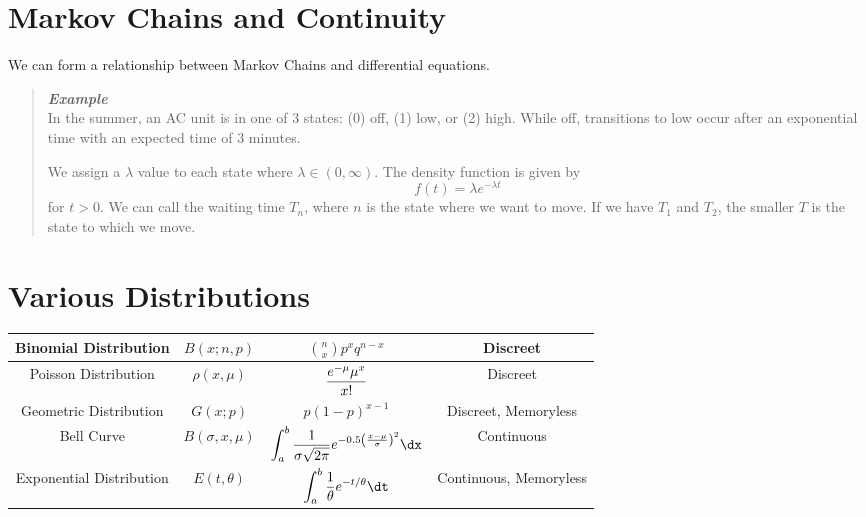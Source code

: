 \documentclass{hw}
\begin{document}
\section*{Markov Chains and Continuity}
We can form a relationship between Markov Chains and differential equations.
\begin{quote}
\textit{\textbf{Example}}\\
In the summer, an AC unit is in one of 3 states: (0) off, (1) low, or (2) high. While off,
transitions to low occur after an exponential time with an expected time of 3 minutes.
\begin{center}
\end{center}
We assign a $\lambda$ value to each state where $\lambda\in(0,\infty)$. The density function is
given by
\[
f(t)=\lambda e^{-\lambda t}
\]
for $t>0$. We can call the waiting time $T_{n}$, where $n$ is the state where we want to move. If
we have $T_{1}$ and $T_{2}$, the smaller $T$ is the state to which we move.
\end{quote}


\section*{Various Distributions}
\begin{center}
\bgroup
\def\arraystretch{3.5}
\begin{tabular}{|c | c | c | c|}
\hline
Binomial Distribution & $B(x;n,p)$ & $\displaystyle \binom{n}{x}p^{x}q^{n-x}$ & Discreet\\
\hline
Poisson Distribution & $\rho(x,\mu)$ & $\displaystyle {e^{-\mu}\mu^{x}\over x!}$ & Discreet\\
\hline
Geometric Distribution & $G(x;p)$ & $\displaystyle p(1-p)^{x-1}$ & Discreet, Memoryless\\
\hline
Bell Curve & $B(\sigma,x,\mu)$ & $\displaystyle \int_{a}^{b}{1\over \sigma\sqrt{2\pi}}e^{-0.5\left({x-\mu\over\sigma}\right)^{2}}\dx$ & Continuous\\
\hline
Exponential Distribution & $E(t,\theta)$ & $\displaystyle\int_{a}^{b}{1\over\theta}e^{-t/\theta}\dt$ & Continuous, Memoryless\\
\hline
\end{tabular}
\egroup
\end{center}
\end{document}
